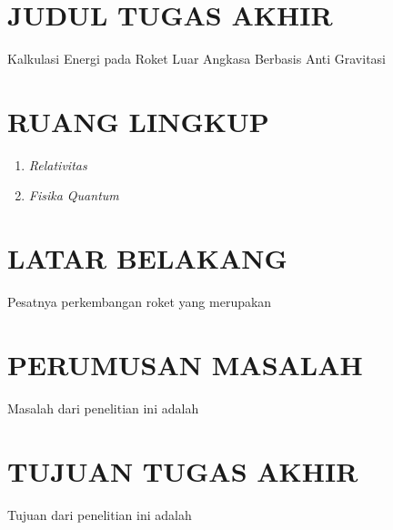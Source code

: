 \section{JUDUL TUGAS AKHIR}
\vspace{1ex}

Kalkulasi Energi pada Roket Luar Angkasa Berbasis Anti Gravitasi
\vspace{0.5ex}

\section{RUANG LINGKUP}
\vspace{1ex}

\begin{enumerate}[nolistsep]
  \item \textit{Relativitas}
  \item \textit{Fisika Quantum}
\end{enumerate}
\vspace{0.5ex}

\section{LATAR BELAKANG}
\vspace{1ex}

Pesatnya perkembangan roket yang merupakan \lipsum[1]
\vspace{0.5ex}

\lipsum[2]
\vspace{0.5ex}

\lipsum[3][1-10]
\vspace{0.5ex}

\section{PERUMUSAN MASALAH}
\vspace{1ex}

Masalah dari penelitian ini adalah \lipsum[1][1-6]
\vspace{0.5ex}

\section{TUJUAN TUGAS AKHIR}
\vspace{1ex}

Tujuan dari penelitian ini adalah \lipsum[1][1-6]
\vspace{0.5ex}